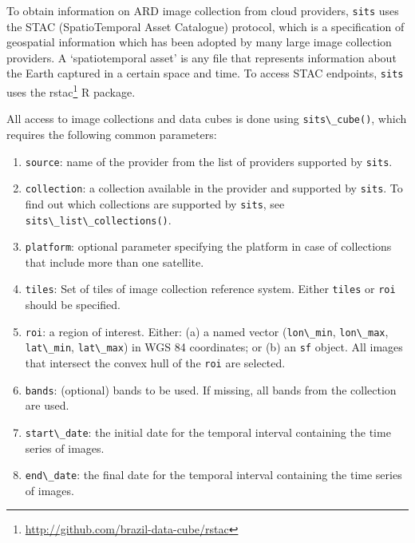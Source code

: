 \documentclass[
  11pt,
]{report}
\newcommand{\passthrough}[1]{#1}
\providecommand{\tightlist}{%
  \setlength{\itemsep}{0pt}\setlength{\parskip}{0pt}}
\renewcommand{\href}[2]{#2\footnote{\url{#1}}}
\begin{document}
To obtain information on ARD image collection from cloud providers,
\passthrough{\lstinline!sits!} uses the STAC (SpatioTemporal Asset
Catalogue) protocol, which is a specification of geospatial information
which has been adopted by many large image collection providers. A
`spatiotemporal asset' is any file that represents information about the
Earth captured in a certain space and time. To access STAC endpoints,
\passthrough{\lstinline!sits!} uses the
\href{http://github.com/brazil-data-cube/rstac}{rstac} R package.

All access to image collections and data cubes is done using
\passthrough{\lstinline!sits\_cube()!}, which requires the following
common parameters:

\begin{enumerate}
\def\labelenumi{\arabic{enumi}.}
\tightlist
\item
  \passthrough{\lstinline!source!}: name of the provider from the list
  of providers supported by \passthrough{\lstinline!sits!}.
\item
  \passthrough{\lstinline!collection!}: a collection available in the
  provider and supported by \passthrough{\lstinline!sits!}. To find out
  which collections are supported by \passthrough{\lstinline!sits!}, see
  \passthrough{\lstinline!sits\_list\_collections()!}.
\item
  \passthrough{\lstinline!platform!}: optional parameter specifying the
  platform in case of collections that include more than one satellite.
\item
  \passthrough{\lstinline!tiles!}: Set of tiles of image collection
  reference system. Either \passthrough{\lstinline!tiles!} or
  \passthrough{\lstinline!roi!} should be specified.
\item
  \passthrough{\lstinline!roi!}: a region of interest. Either: (a) a
  named vector (\passthrough{\lstinline!lon\_min!},
  \passthrough{\lstinline!lon\_max!},
  \passthrough{\lstinline!lat\_min!},
  \passthrough{\lstinline!lat\_max!}) in WGS 84 coordinates; or (b) an
  \passthrough{\lstinline!sf!} object. All images that intersect the
  convex hull of the \passthrough{\lstinline!roi!} are selected.
\item
  \passthrough{\lstinline!bands!}: (optional) bands to be used. If
  missing, all bands from the collection are used.
\item
  \passthrough{\lstinline!start\_date!}: the initial date for the
  temporal interval containing the time series of images.
\item
  \passthrough{\lstinline!end\_date!}: the final date for the temporal
  interval containing the time series of images.
\end{enumerate}
\end{document}
